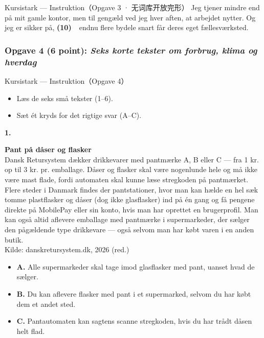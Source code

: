 \begin{emailbox}{Kursistark --- Instruktion（Opgave 3 · 无词库开放完形）}
\vspace{0.25em}
Jeg tjener mindre end på mit gamle kontor, men til gengæld ved jeg hver aften, at arbejdet nytter. Og jeg er sikker på, \textbf{(10)\ \underline{\hspace{2.1cm}}}\ endnu flere bydele snart får deres eget fællesværksted.
\end{emailbox}

\subsubsection*{Opgave 4 (6 point): \textit{Seks korte tekster om forbrug, klima og hverdag}}

\begin{emailbox}{Kursistark --- Instruktion（Opgave 4）}
\begin{itemize}
  \item Læs de seks små tekster (1--6).
  \item Sæt ét kryds for det rigtige svar (A--C).
\end{itemize}
\end{emailbox}

\vspace{0.2em}
\textbf{\color{NCDRed}1.}
\begin{tcolorbox}[enhanced, breakable, colback=white, colframe=NCDGold, boxrule=0.8pt, arc=2pt, left=9pt, right=9pt, top=6pt, bottom=6pt]
\textbf{Pant på dåser og flasker}\\
Dansk Retursystem dækker drikkevarer med pantmærke A, B eller C --- fra 1 kr. op til 3 kr. pr. emballage. Dåser og flasker skal være nogenlunde hele og må ikke være mast flade, fordi automaten skal kunne læse stregkoden på pantmærket. Flere steder i Danmark findes der pantstationer, hvor man kan hælde en hel sæk tomme plastflasker og dåser (dog ikke glasflasker) ind på én gang og få pengene direkte på MobilePay eller sin konto, hvis man har oprettet en brugerprofil. Man kan også altid aflevere emballage med pantmærke i supermarkeder, der sælger den pågældende type drikkevare --- også selvom man har købt varen i en anden butik.\\[2pt]
\null\hfill {\small\color{NCDGray}Kilde: danskretursystem.dk, 2026 (red.)}
\end{tcolorbox}
\begin{itemize}[leftmargin=1.8em, itemsep=0.12em]
  \item[{\small\fbox{\phantom{\textsf{x}}}}] \textbf{A.} Alle supermarkeder skal tage imod glasflasker med pant, uanset hvad de sælger.
  \item[{\small\fbox{\phantom{\textsf{x}}}}] \textbf{B.} Du kan aflevere flasker med pant i et supermarked, selvom du har købt dem et andet sted.
  \item[{\small\fbox{\phantom{\textsf{x}}}}] \textbf{C.} Pantautomaten kan sagtens scanne stregkoden, hvis du har trådt dåsen helt flad.
\end{itemize}

